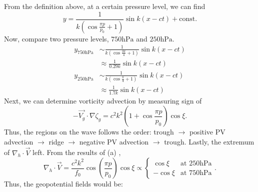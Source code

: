 \documentclass[11pt,a4paper]{article}
\begin{document}
{\begin{enumerate}[label=(\alph*)]
\begin{solution}
From the definition above, at a certain pressure level, we can find 
$$y = \frac{1}{k \left(\cos \frac{\pi p}{p_0} + 1 \right)}\sin k(x-ct) + \mathrm{const}.$$
Now, compare two pressure levels, $750\mathrm{hPa}$ and $250\mathrm{hPa}.$
\begin{align*}
    y_{750\mathrm{hPa}} &\sim \frac{1}{k \left(\cos \frac{3\pi}{4} + 1 \right)}\sin k(x-ct)\\
    &\approx \frac{1}{0.29k}\sin k(x-ct)\\
    y_{250\mathrm{hPa}} &\sim \frac{1}{k \left(\cos \frac{\pi}{4} + 1 \right)}\sin k(x-ct)\\
    &\approx \frac{1}{1.7k}\sin k(x-ct)
\end{align*}
Next, we can determine vorticity advection by measuring sign of $$-\vec{V_g}\cdot \nabla \zeta_g= c^2 k^2\left(1+\cos\frac{\pi p}{p_0}\right) \cos \xi.$$
Thus, the regions on the wave follows the order: trough $\to$ positive PV advection $\to$ ridge $\to$ negative PV advection $\to$ trough.
Lastly, the extremum of $\nabla_h\cdot \vec{V}$ left. From the results of (a) ,
$$\nabla_h\cdot \vec{V} = \frac{c^2 k^2}{f_0} \cos \left(\frac{\pi p}{p_0}\right)\cos \xi
\propto\begin{cases}
    \cos \xi & \text{at }250\mathrm{hPa}\\
    -\cos \xi & \text{at }750\mathrm{hPa}
\end{cases}.$$
Thus, the geopotential fields would be:
\begin{center}
\end{center}
\end{solution}
\end{enumerate}}
\end{document}
